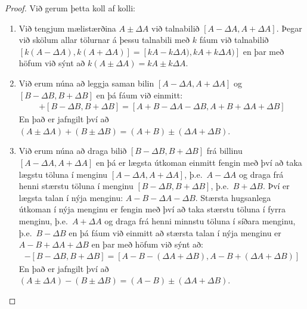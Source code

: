 \ifdefined \wholebook \else\documentclass[oneside]{book}\usepackage{EdlBook}\graphicspath{{figures/}}
\begin{document}
\begin{proof} Við gerum þetta koll af kolli:

\begin{enumerate}[label = \textbf{(\roman*)}]
    \item Við tengjum mælistærðina $A\pm \Delta A$ við talnabilið $[A-\Delta A, A + \Delta A]$. Þegar við skölum allar tölurnar á þessu talnabili með $k$ fáum við talnabilið $[k(A-\Delta A), k(A+\Delta A) ] = [kA-k\Delta A), kA+k\Delta A) ]$ en þar með höfum við sýnt að $k(A\pm \Delta A) = k A \pm k \Delta A$.
    
    \item Við erum núna að leggja saman bilin $[A-\Delta A, A+\Delta A ]$ og $[B-\Delta B, B+\Delta B ]$ en þá fáum við einmitt:
    \begin{align*}
        [A-\Delta A, A+\Delta A ] + [B-\Delta B, B+\Delta B ] = [A+B - \Delta A - \Delta B, A + B + \Delta A + \Delta B]
    \end{align*}
    En það er jafngilt því að $(A \pm \Delta A) + (B \pm \Delta B) =  (A+B) \pm (\Delta A + \Delta B)$.
    
    \item Við erum núna að draga bilið $[B-\Delta B, B+\Delta B ]$ frá billinu $[A-\Delta A, A+\Delta A ]$ en þá er lægsta útkoman einmitt fengin með því að taka lægstu töluna í menginu $[A-\Delta A, A+\Delta A ]$, þ.e.~$A - \Delta A$ og draga frá henni stærstu töluna í menginu $[B-\Delta B, B+\Delta B ]$, þ.e.~$B + \Delta B$. Því er lægsta talan í nýja menginu: $A-B - \Delta A - \Delta B$.
    Stærsta hugsanlega útkoman í nýja menginu er fengin með því að taka stærstu töluna í fyrra menginu, þ.e.~$A + \Delta A$ og draga frá henni minnstu töluna í síðara menginu, þ.e.~$B - \Delta B$ en þá fáum við einmitt að stærsta talan í nýja menginu er $A - B + \Delta A + \Delta B $ en þar með höfum við sýnt að:
    \begin{align*}
        [A-\Delta A, A+\Delta A ] - [B-\Delta B, B+\Delta B ] = [A -B - (\Delta A + \Delta B), A - B + (\Delta A + \Delta B)]
    \end{align*}
    En það er jafngilt því að $(A \pm \Delta A) - (B \pm \Delta B) =  (A-B) \pm (\Delta A + \Delta B)$.
    

\end{enumerate}
\end{proof}
\end{document}
